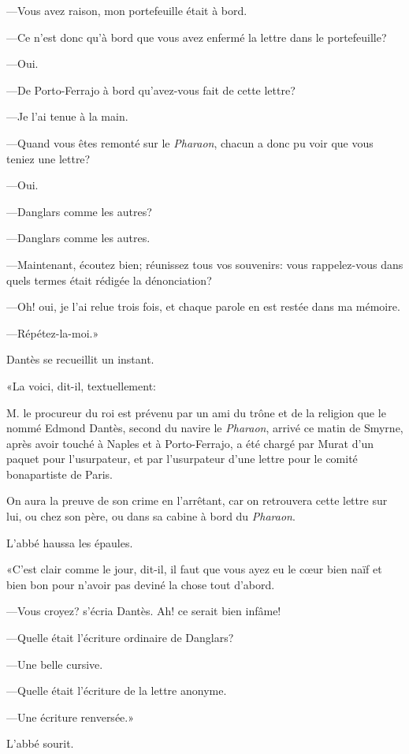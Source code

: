 —Vous avez raison, mon portefeuille était à bord.

—Ce n'est donc qu'à bord que vous avez enfermé la lettre dans le portefeuille?

—Oui.

—De Porto-Ferrajo à bord qu'avez-vous fait de cette lettre?

—Je l'ai tenue à la main.

—Quand vous êtes remonté sur le \textit{Pharaon}, chacun a donc pu voir que vous teniez une lettre?

—Oui.

—Danglars comme les autres?

—Danglars comme les autres.

—Maintenant, écoutez bien; réunissez tous vos souvenirs: vous rappelez-vous dans quels termes était rédigée la dénonciation?

—Oh! oui, je l'ai relue trois fois, et chaque parole en est restée dans ma mémoire.

—Répétez-la-moi.»

Dantès se recueillit un instant.

«La voici, dit-il, textuellement:

\begin{mail}{}{}
M. le procureur du roi est prévenu par un ami du trône et de la religion que le nommé Edmond Dantès, second du navire le \textit{Pharaon}, arrivé ce matin de Smyrne, après avoir touché à Naples et à Porto-Ferrajo, a été chargé par Murat d'un paquet pour l'usurpateur, et par l'usurpateur d'une lettre pour le comité bonapartiste de Paris.

On aura la preuve de son crime en l'arrêtant, car on retrouvera cette lettre sur lui, ou chez son père, ou dans sa cabine à bord du \textit{Pharaon}.
\end{mail}

L'abbé haussa les épaules.

«C'est clair comme le jour, dit-il, il faut que vous ayez eu le cœur bien naïf et bien bon pour n'avoir pas deviné la chose tout d'abord.

—Vous croyez? s'écria Dantès. Ah! ce serait bien infâme!

—Quelle était l'écriture ordinaire de Danglars?

—Une belle cursive.

—Quelle était l'écriture de la lettre anonyme.

—Une écriture renversée.»

L'abbé sourit.

